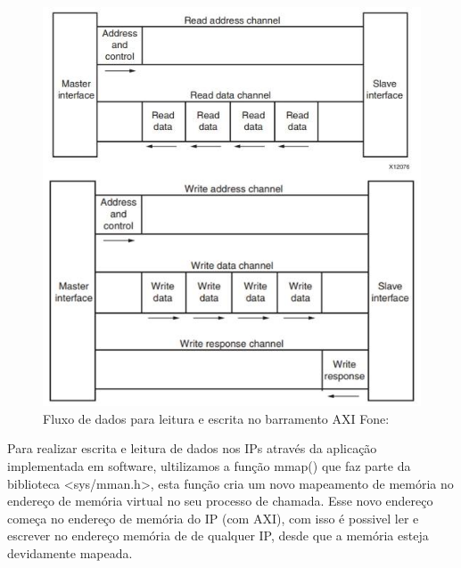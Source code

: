 \begin{figure}[h]
	\centering
	\includegraphics[keepaspectratio=true,scale=0.5]{figuras/axi_bus.png}
	\caption{Fluxo de dados para leitura e escrita no barramento AXI Fone: \cite{user-guide-axi}}
	\label{axi_bus}
\end{figure}

Para realizar escrita e leitura de dados nos IPs através da aplicação implementada em software, ultilizamos a função mmap() que faz parte da biblioteca <sys/mman.h>, esta função cria um novo mapeamento de memória no endereço de memória virtual no seu processo de chamada. Esse novo endereço começa no endereço de memória do IP (com AXI), com isso é possivel ler e escrever no endereço memória de de qualquer IP, desde que a memória esteja devidamente mapeada. 


\vspace{\onelineskip}

